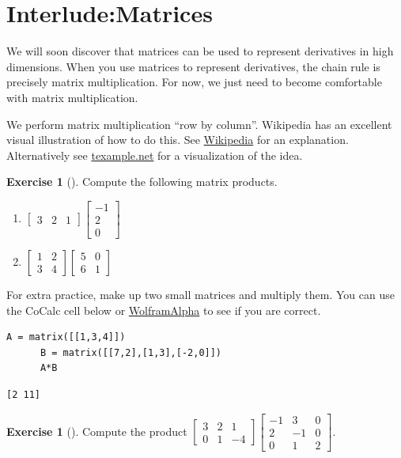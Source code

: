 \documentclass[10pt,]{book}
\theoremstyle{plain}
\theoremstyle{definition}
\theoremstyle{definition}
\theoremstyle{definition}
\theoremstyle{definition}
\newtheorem{exploration}[project]{Exercise}
\theoremstyle{definition}
\numberwithin{equation}{section}
\newcommand{\amp}{&}
\begin{document}
\section[{Interlude:Matrices}]{Interlude:Matrices}\label{review_matrices}
We will soon discover that matrices can be used to represent derivatives in high dimensions. When you use matrices to represent derivatives, the chain rule is precisely matrix multiplication. For now, we just need to become comfortable with matrix multiplication.%
\par
We perform matrix multiplication ``row by column''. Wikipedia has an excellent visual illustration of how to do this. See \href{http://en.wikipedia.org/wiki/Matrix_multiplication}{Wikipedia} for an explanation. Alternatively see \href{http://www.texample.net/tikz/examples/matrix-multiplication/}{texample.net} for a visualization of the idea.%
\begin{exploration}[]\label{exploration-37}
Compute the following matrix products.%
\begin{enumerate}[font=\bfseries,label=(\alph*),ref=\alph*]
\item\label{task-70} \(\begin{bmatrix}3 \amp  2\amp  1
\end{bmatrix} 
\begin{bmatrix}-1 \\
2\\
0
\end{bmatrix}\)%
\item\label{task-71} \(\begin{bmatrix}1 \amp 2\\3\amp 4
\end{bmatrix} \begin{bmatrix}5\amp 0\\6\amp 1
\end{bmatrix}\)%
\end{enumerate}
\bigbreak
For extra practice, make up two small matrices and multiply them. You can use the CoCalc cell below or \href{http://www.wolframalpha.com/input/?i=\%281\%2C3\%2C4\%29+*\%28\%287\%2C2\%29\%2C\%281\%2C3\%29\%2C\%28-2\%2C0\%29\%29}{WolframAlpha} to see if you are correct.%
\begin{lstlisting}[style=sageinput]
A = matrix([[1,3,4]])
      B = matrix([[7,2],[1,3],[-2,0]])
      A*B
\end{lstlisting}
\begin{lstlisting}[style=sageoutput]
[2 11]
\end{lstlisting}
\end{exploration}
\begin{exploration}[]\label{exploration-38}
Compute the product \(\begin{bmatrix}3 \amp  2\amp  1\\
0 \amp  1\amp  -4
\end{bmatrix} 
\begin{bmatrix}-1\amp 3 \amp 0 \\
2\amp -1 \amp 0\\
0\amp 1 \amp 2
\end{bmatrix}\).%
\end{exploration}
\typeout{************************************************}
\typeout{************************************************}
\end{document}
